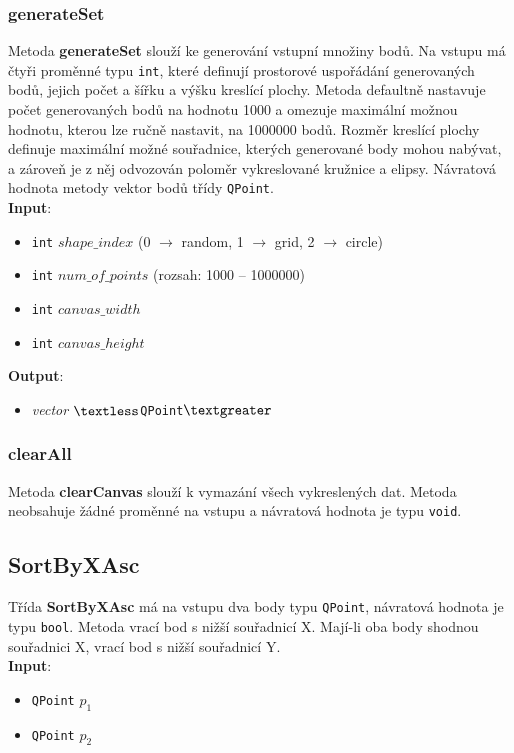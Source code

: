 \documentclass[a4paper, 12pt]{article}
\begin{document}
\subsubsection{generateSet}
Metoda \textbf{generateSet} slouží ke generování vstupní množiny bodů. Na vstupu má čtyři proměnné typu \texttt{int}, které definují prostorové uspořádání generovaných bodů, jejich počet a šířku a výšku kreslící plochy. Metoda defaultně nastavuje počet generovaných bodů na hodnotu 1000 a omezuje maximální možnou hodnotu, kterou lze ručně nastavit, na 1000000 bodů. Rozměr kreslící plochy definuje maximální možné souřadnice, kterých generované body mohou nabývat, a zároveň je z něj odvozován poloměr vykreslované kružnice a elipsy. Návratová hodnota metody vektor bodů třídy \texttt{QPoint}.\\

\textbf{Input}:
\begin{itemize}
\item \texttt{int} $shape\_index$ (0 $\rightarrow$ random, 1 $\rightarrow$ grid, 2 $\rightarrow$ circle)
\item \texttt{int} $num\_of\_points$ (rozsah: 1000 – 1000000)
\item \texttt{int} $canvas\_width$
\item \texttt{int} $canvas\_height$
\end{itemize}

\textbf{Output}:
\begin{itemize}
\item \textsl{vector} $\textless$\texttt{QPoint}$\textgreater$
\end{itemize}

\subsubsection{clearAll}
Metoda \textbf{clearCanvas} slouží k vymazání všech vykreslených dat. Metoda neobsahuje žádné proměnné na vstupu a návratová hodnota je typu \texttt{void}.

\subsection{SortByXAsc}
Třída \textbf{SortByXAsc} má na vstupu dva body typu \texttt{QPoint}, návratová hodnota je typu \texttt{bool}. Metoda vrací bod s nižší  souřadnicí X. Mají-li oba body shodnou souřadnici X, vrací bod s nižší souřadnicí Y.\\

\textbf{Input}:
\begin{itemize}
\item \texttt{QPoint} $p_1$
\item \texttt{QPoint} $p_2$
\end{itemize}
\end{document}
